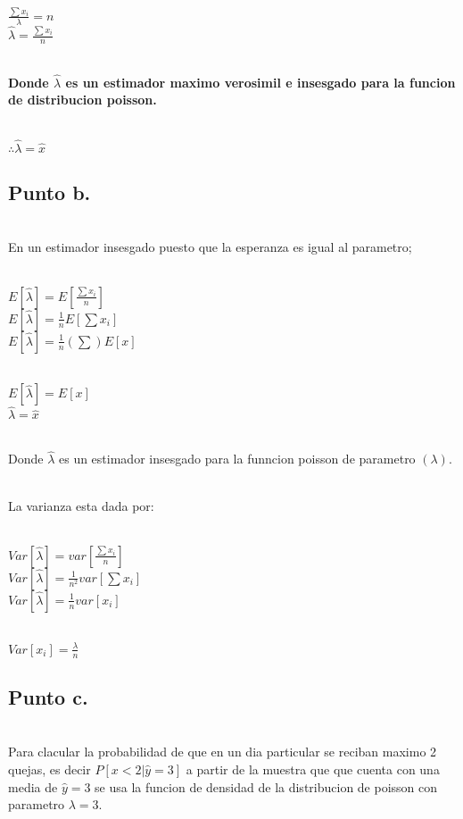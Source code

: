 \documentclass[letterpaper,12pt,onecolumn,titlepage]{article}
\begin{document}
~\\ $\frac{\sum{x_{i}}}{\lambda} = n $
~\\ $\hat{\lambda} = \frac{\sum{x_{i}}}{n}$

~\\ \textbf{Donde $\hat{\lambda}$ es un estimador maximo verosimil e insesgado para la funcion de distribucion poisson.} 
 
~\\ $\therefore \hat{\lambda} = \hat{x}$

\subsection{Punto b.}
~\\ En un estimador insesgado puesto que la esperanza es igual al parametro;

~\\ $E[\hat{\lambda}] = E[\frac{\sum{x_{i}}}{n}]$
~\\ $E[\hat{\lambda}] = \frac{1}{n}E[\sum{x_{i}}]$
~\\ $E[\hat{\lambda}] = \frac{1}{n}(\sum)E[x]$

~\\ $E[\hat{\lambda}] = E[x]$
~\\ $\hat{\lambda} = \hat{x}$

~\\ Donde $\hat{\lambda}$ es un estimador insesgado para la funncion poisson de parametro $(\lambda)$. 

~\\ La varianza esta dada por: 

~\\ $Var[\hat{\lambda}]= var[\frac{\sum{x_{i}}}{n}]$
~\\ $Var[\hat{\lambda}]= \frac{1}{n^2} var[\sum{x_{i}}]$
~\\ $Var[\hat{\lambda}]= \frac{1}{n} var[x_{i}]$

~\\ $Var[x_{i}]= \frac{\lambda}{n}$

\subsection{Punto c.}
~\\ Para clacular la probabilidad de que en un dia particular se reciban maximo 2 quejas, es decir $P[x<2|\hat{y}=3]$ a partir de la muestra que que cuenta con una media de $\hat{y}=3$ se usa la funcion de densidad de la distribucion de poisson con parametro $\lambda=3$. 
\end{document}
